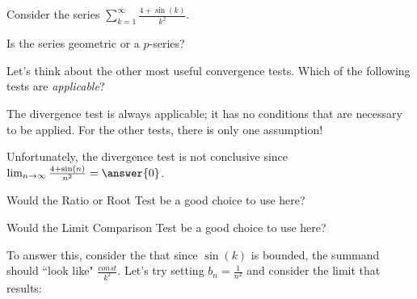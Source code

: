 \documentclass{ximera}
\author{Jim Talamo}
\begin{document}
\begin{exercise}

Consider the series $\sum_{k=1}^{\infty} \frac{4+\sin(k)}{k^2}$.  

Is the series geometric or a $p$-series?

\begin{multipleChoice}
\end{multipleChoice}

Let's think about the other most useful convergence tests.  Which of the following tests are \emph{applicable}?

\begin{selectAll}
\end{selectAll}

\begin{hint}
The divergence test is always applicable; it has no conditions that are necessary to be applied. For the other tests, there is only one assumption!
\end{hint}

\begin{exercise}
Unfortunately, the divergence test is not conclusive since $\lim_{n \to \infty} \frac{4+\sin(n)}{n^2} = \answer{0}$.  
\end{exercise}

\begin{exercise}
Would the Ratio or Root Test be a good choice to use here?

\begin{multipleChoice}
\end{multipleChoice}
\end{exercise}

\begin{exercise}
Would the Limit Comparison Test be a good choice to use here?  

To answer this, consider the that since $\sin(k)$ is bounded,  the summand should ``look like" $\frac{const}{k^2}$.  Let's try setting $b_n = \frac{1}{n^2}$ and consider the limit that results:


\end{exercise}
\end{exercise}
\end{document}
